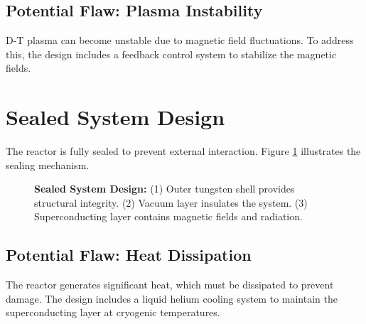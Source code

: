 \documentclass[12pt, a4paper]{article}
\begin{document}
\subsection{Potential Flaw: Plasma Instability}
D-T plasma can become unstable due to magnetic field fluctuations. To address this, the design includes a feedback control system to stabilize the magnetic fields.

\section{Sealed System Design}
The reactor is fully sealed to prevent external interaction. Figure \ref{fig:sealed_system} illustrates the sealing mechanism.

\begin{figure}[H]
\centering
{}
\caption{
\textbf{Sealed System Design:} 
(1) Outer tungsten shell provides structural integrity. 
(2) Vacuum layer insulates the system. 
(3) Superconducting layer contains magnetic fields and radiation.
}
\label{fig:sealed_system}
\end{figure}

\subsection{Potential Flaw: Heat Dissipation}
The reactor generates significant heat, which must be dissipated to prevent damage. The design includes a liquid helium cooling system to maintain the superconducting layer at cryogenic temperatures.

\end{document}
